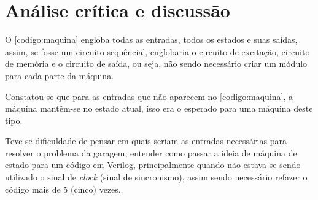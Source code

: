 \chapter{Análise crítica e discussão}
	O \autoref{codigo:maquina} engloba todas as entradas, todos os estados e suas
	saídas, assim, se fosse um circuito sequêncial, englobaria o circuito de
	excitação, circuito de memória e o circuito de saída, ou seja, não sendo necessário
	criar um módulo para cada parte da máquina.

	Constatou-se que para as entradas que não aparecem no \autoref{codigo:maquina},
	a máquina mantêm-se no estado atual, isso era o esperado para uma máquina deste tipo.

	Teve-se dificuldade de pensar em quais seriam as entradas necessárias para resolver
	o problema da garagem, entender como passar a ideia de máquina de estado para um código
	em Verilog, principalmente quando não estava-se sendo utilizado o sinal de \textit{clock} (sinal
	de sincronismo), assim sendo necessário refazer o código mais de 5 (cinco) vezes.

